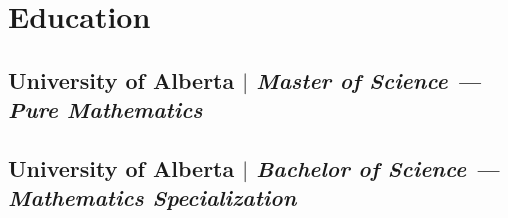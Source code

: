 \documentclass[10pt]{article}
\begin{document}
\section{Education}

\subsection{University of Alberta $|$ \normalfont\textit{Master of Science --- Pure Mathematics}}
\subsection{University of Alberta $|$ \normalfont\textit{Bachelor of Science --- Mathematics Specialization}}
\end{document}
